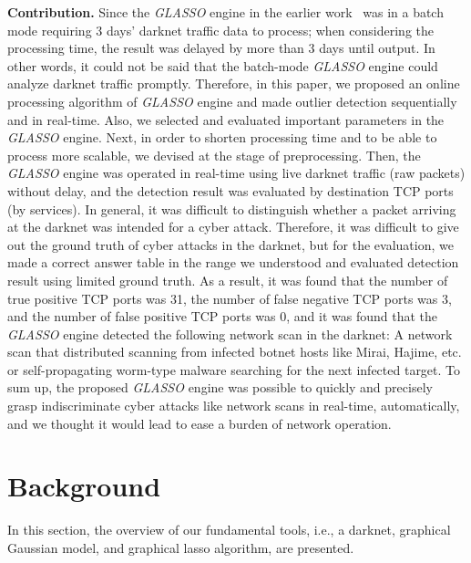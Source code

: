 \documentclass[conference]{IEEEtran}
\begin{document}
\noindent
\textbf{Contribution.}\space\space
Since the {\it GLASSO} engine in the earlier work~\cite{Han} was in a batch mode requiring 3 days' darknet traffic data to process; when considering the processing time, the result was delayed by more than 3 days until output.
In other words, it could not be said that the batch-mode {\it GLASSO} engine could analyze darknet traffic promptly.
Therefore, in this paper, we proposed an online processing algorithm of {\it GLASSO} engine and made outlier detection sequentially and in real-time.
Also, we selected and evaluated important parameters in the {\it GLASSO} engine.
Next, in order to shorten processing time and to be able to process more scalable, we devised at the stage of preprocessing.
Then, the {\it GLASSO} engine was operated in real-time using live darknet traffic (raw packets) without delay, and the detection result was evaluated by destination TCP ports (by services).
In general, it was difficult to distinguish whether a packet arriving at the darknet was intended for a cyber attack.
Therefore, it was difficult to give out the ground truth of cyber attacks in the darknet, but for the evaluation, we made a correct answer table in the range we understood and evaluated detection result using limited ground truth.
As a result, it was found that the number of true positive TCP ports was 31, the number of false negative TCP ports was 3, and the number of false positive TCP ports was 0, and it was found that the {\it GLASSO} engine detected the following network scan in the darknet: A network scan that distributed scanning from infected botnet hosts like Mirai, Hajime, etc. or self-propagating worm-type malware searching for the next infected target.
To sum up, the proposed {\it GLASSO} engine was possible to quickly and precisely grasp indiscriminate cyber attacks like network scans in real-time, automatically, and we thought it would lead to ease a burden of network operation.




\section{Background}
In this section, the overview of our fundamental tools, i.e., a darknet, graphical Gaussian model, and graphical lasso algorithm, are presented.
\end{document}
